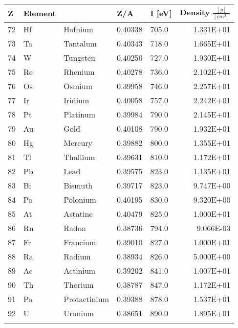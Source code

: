 \begin{tabular}{l|l|l|l|l|r}
Z & Element &   & Z/A & I [eV] & Density $\frac{[g]}{[cm^3]}$ \\
\hline
72 &	Hf &	Hafnium &	0.40338 &	705.0 &	1.331E+01 \\
73 &	Ta &	Tantalum &	0.40343 &	718.0 &	1.665E+01 \\
74 &	W  &	Tungsten &	0.40250 &   727.0 &	1.930E+01 \\
75 &	Re &	Rhenium &	0.40278 &	736.0 &	2.102E+01 \\
76 &	Os &	Osmium  &	0.39958 &	746.0 &	2.257E+01 \\
77 &	Ir &	Iridium &	0.40058 &	757.0 &	2.242E+01 \\
78 &	Pt &	Platinum &	0.39984 &	790.0 &	2.145E+01 \\
79 &	Au &	Gold &	0.40108 &	790.0 &	1.932E+01 \\
80 &	Hg &	Mercury  &	0.39882 &	800.0 &	1.355E+01 \\
81 &	Tl &	Thallium &	0.39631 &	810.0 &	1.172E+01 \\
82 &	Pb &	Lead &	0.39575 &	823.0 &	1.135E+01 \\
83 &	Bi &	Bismuth  &	0.39717 &	823.0 &	9.747E+00 \\
84 &	Po &	Polonium &	0.40195 &	830.0 &	9.320E+00 \\
85 &	At &	Astatine &	0.40479 &	825.0 &	1.000E+01 \\
86 &	Rn &	Radon &	0.38736 &	794.0 & 	9.066E-03 \\
87 &	Fr &	Francium &	0.39010 &	827.0 &	1.000E+01 \\
88 &	Ra &	Radium   &	0.38934 &	826.0 &	5.000E+00 \\
89 &	Ac &	Actinium &	0.39202 &	841.0 &	1.007E+01 \\
90 &	Th &	Thorium  &	0.38787 &	847.0 &	1.172E+01 \\
91 &	Pa &	Protactinium &	0.39388 &	878.0 &	1.537E+01 \\
92 &	U  &	Uranium &	0.38651 &	890.0 &	1.895E+01 \\
\label{table: absorption coeff.}
\end{tabular}